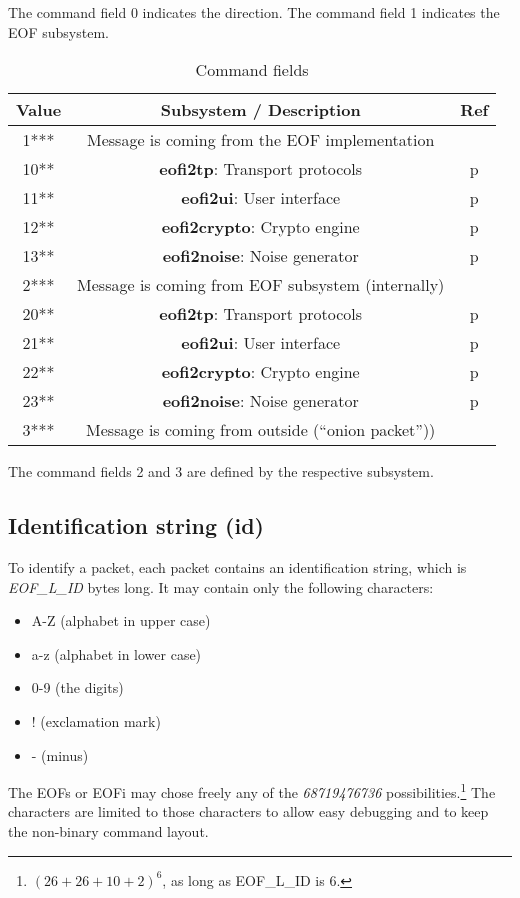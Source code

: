 \documentclass[12pt,a4paper]{book}
\begin{document}
The command field 0 indicates the direction.
The command field 1 indicates the EOF subsystem.
\begin{longtable}{|c|c|c|}
\caption{Command fields}\\
\hline
\textbf{Value} & \textbf{Subsystem} / \textbf{Description} & \textbf{Ref}\\
\hline
1*** & Message is coming from the EOF implementation &\\
\hline
10** & \textbf{eofi2tp}: Transport protocols & p\pageref{eofi2tp}\\
\hline
11** & \textbf{eofi2ui}: User interface & p\pageref{eofi2ui}\\
\hline
12** & \textbf{eofi2crypto}: Crypto engine & p\pageref{eofi2crypto}\\
\hline
13** & \textbf{eofi2noise}: Noise generator & p\pageref{eofi2noise}\\
\hline
2*** & Message is coming from EOF subsystem (internally) &\\
\hline
20** & \textbf{eofi2tp}: Transport protocols & p\pageref{eofi2tp}\\
\hline
21** & \textbf{eofi2ui}: User interface & p\pageref{eofi2ui}\\
\hline
22** & \textbf{eofi2crypto}: Crypto engine & p\pageref{eofi2crypto}\\
\hline
23** & \textbf{eofi2noise}: Noise generator & p\pageref{eofi2noise}\\
\hline
3*** & Message is coming from outside ("`onion packet"')) &\\
\hline
\end{longtable}
The command fields 2 and 3 are defined by the respective subsystem.
\subsection{Identification string (id)}
\label{idn}
To identify a packet, each packet contains an identification string,
which is \emph{EOF\_L\_ID} bytes long. It may contain only the
following characters:
\begin{itemize}
\item A-Z (alphabet in upper case)
\item a-z (alphabet in lower case)
\item 0-9 (the digits)
\item ! (exclamation mark)
\item - (minus)
\end{itemize}
The EOFs or EOFi may chose freely any of the \emph{68719476736}
possibilities.\footnote{$(26+26+10+2)^6$, as long as EOF\_L\_ID is 6.}
The characters are limited to those characters to allow easy debugging
and to keep the non-binary command layout.
\end{document}
